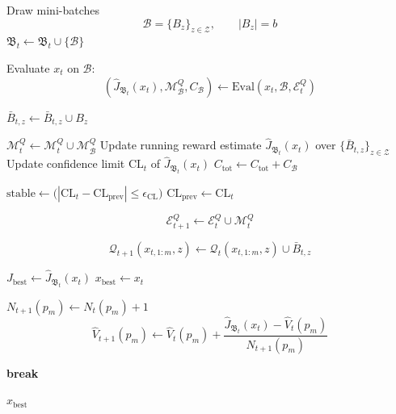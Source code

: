 \documentclass{article}
\begin{document}
\begin{algorithm}[t]
\begin{algorithmic}[1]
    \Repeat
        \State Draw mini-batches
        \[
        \mathcal B=\{B_z\}_{z\in\mathcal Z},
        \qquad
        |B_z|=b
        \]
        \State \(\mathfrak B_t\leftarrow\mathfrak B_t\cup\{\mathcal B\}\)

        \State Evaluate \(x_t\) on \(\mathcal B\):
        \[
        \left(
        \widehat J_{\mathfrak B_t}(x_t),
        \mathcal M_{\mathcal B}^Q,
        C_{\mathcal B}
        \right)
        \leftarrow
        \mathrm{Eval}(x_t,\mathcal B,\mathcal E_t^Q)
        \]

            \State \(\bar B_{t,z}\leftarrow\bar B_{t,z}\cup B_z\)
        \EndFor

        \State \(\mathcal M_t^Q\leftarrow\mathcal M_t^Q\cup\mathcal M_{\mathcal B}^Q\)
        \State Update running reward estimate \(\widehat J_{\mathfrak B_t}(x_t)\) over \(\{\bar B_{t,z}\}_{z\in\mathcal Z}\)
        \State Update confidence limit \(\mathrm{CL}_t\) of \(\widehat J_{\mathfrak B_t}(x_t)\)
        \State \(C_{\mathrm{tot}}\leftarrow C_{\mathrm{tot}}+C_{\mathcal B}\)

        \State \(\mathrm{stable}\leftarrow
        \bigl(
        |\mathrm{CL}_t-\mathrm{CL}_{\mathrm{prev}}|
        \le
        \epsilon_{\mathrm{CL}}
        \bigr)\)
        \State \(\mathrm{CL}_{\mathrm{prev}}\leftarrow\mathrm{CL}_t\)


    \State \[
    \mathcal E_{t+1}^Q
    \leftarrow
    \mathcal E_t^Q\cup\mathcal M_t^Q
    \]

        \State
        \[
        \mathcal Q_{t+1}(x_{t,1:m},z)
        \leftarrow
        \mathcal Q_t(x_{t,1:m},z)\cup\bar B_{t,z}
        \]
    \EndFor

        \State \(J_{\mathrm{best}}\leftarrow\widehat J_{\mathfrak B_t}(x_t)\)
        \State \(x_{\mathrm{best}}\leftarrow x_t\)
    \EndIf

        \State \(N_{t+1}(p_m)\leftarrow N_t(p_m)+1\)
        \State
        \[
        \hat V_{t+1}(p_m)
        \leftarrow
        \hat V_t(p_m)
        +
        \frac{
        \widehat J_{\mathfrak B_t}(x_t)-\hat V_t(p_m)
        }{
        N_{t+1}(p_m)
        }
        \]
    \EndFor

        \State \textbf{break}
    \EndIf
\EndFor

\State \Return \(x_{\mathrm{best}}\)
\end{algorithmic}
\end{algorithm}
\end{document}

